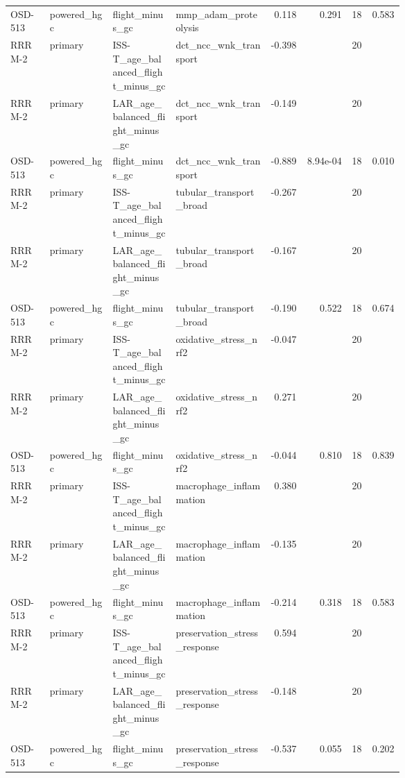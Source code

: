 \documentclass[11pt]{article}
\begin{document}
\begin{landscape}
\begin{longtable}{p{0.10\linewidth}p{0.16\linewidth}p{0.16\linewidth}p{0.24\linewidth}rrrr}
OSD-513 & powered\_hgc & flight\_minus\_gc & mmp\_adam\_proteolysis & 0.118 & 0.291 & 18 & 0.583 \\
RRRM-2 & primary & ISS-T\_age\_balanced\_flight\_minus\_gc & dct\_ncc\_wnk\_transport & -0.398 &  & 20 &  \\
RRRM-2 & primary & LAR\_age\_balanced\_flight\_minus\_gc & dct\_ncc\_wnk\_transport & -0.149 &  & 20 &  \\
OSD-513 & powered\_hgc & flight\_minus\_gc & dct\_ncc\_wnk\_transport & -0.889 & 8.94e-04 & 18 & 0.010 \\
RRRM-2 & primary & ISS-T\_age\_balanced\_flight\_minus\_gc & tubular\_transport\_broad & -0.267 &  & 20 &  \\
RRRM-2 & primary & LAR\_age\_balanced\_flight\_minus\_gc & tubular\_transport\_broad & -0.167 &  & 20 &  \\
OSD-513 & powered\_hgc & flight\_minus\_gc & tubular\_transport\_broad & -0.190 & 0.522 & 18 & 0.674 \\
RRRM-2 & primary & ISS-T\_age\_balanced\_flight\_minus\_gc & oxidative\_stress\_nrf2 & -0.047 &  & 20 &  \\
RRRM-2 & primary & LAR\_age\_balanced\_flight\_minus\_gc & oxidative\_stress\_nrf2 & 0.271 &  & 20 &  \\
OSD-513 & powered\_hgc & flight\_minus\_gc & oxidative\_stress\_nrf2 & -0.044 & 0.810 & 18 & 0.839 \\
RRRM-2 & primary & ISS-T\_age\_balanced\_flight\_minus\_gc & macrophage\_inflammation & 0.380 &  & 20 &  \\
RRRM-2 & primary & LAR\_age\_balanced\_flight\_minus\_gc & macrophage\_inflammation & -0.135 &  & 20 &  \\
OSD-513 & powered\_hgc & flight\_minus\_gc & macrophage\_inflammation & -0.214 & 0.318 & 18 & 0.583 \\
RRRM-2 & primary & ISS-T\_age\_balanced\_flight\_minus\_gc & preservation\_stress\_response & 0.594 &  & 20 &  \\
RRRM-2 & primary & LAR\_age\_balanced\_flight\_minus\_gc & preservation\_stress\_response & -0.148 &  & 20 &  \\
OSD-513 & powered\_hgc & flight\_minus\_gc & preservation\_stress\_response & -0.537 & 0.055 & 18 & 0.202 \\
\bottomrule
\end{longtable}
\normalsize
\end{landscape}
\end{document}
